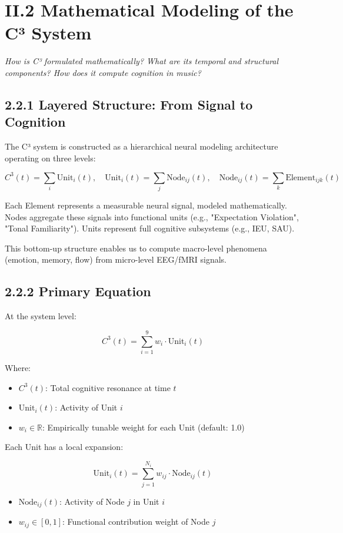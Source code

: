 \section*{II.2 Mathematical Modeling of the C³ System}

\textit{How is C³ formulated mathematically? What are its temporal and structural components? How does it compute cognition in music?}

\subsection*{2.2.1 Layered Structure: From Signal to Cognition}

The C³ system is constructed as a hierarchical neural modeling architecture operating on three levels:

\[
C^3(t) = \sum_i \text{Unit}_i(t), \quad \text{Unit}_i(t) = \sum_j \text{Node}_{ij}(t), \quad \text{Node}_{ij}(t) = \sum_k \text{Element}_{ijk}(t)
\]

Each Element represents a measurable neural signal, modeled mathematically. Nodes aggregate these signals into functional units (e.g., "Expectation Violation", "Tonal Familiarity"). Units represent full cognitive subsystems (e.g., IEU, SAU).

This bottom-up structure enables us to compute macro-level phenomena (emotion, memory, flow) from micro-level EEG/fMRI signals.

\subsection*{2.2.2 Primary Equation}

At the system level:

\[
C^3(t) = \sum_{i=1}^{9} w_i \cdot \text{Unit}_i(t)
\]

Where:

\begin{itemize}
    \item $C^3(t)$: Total cognitive resonance at time $t$
    \item $\text{Unit}_i(t)$: Activity of Unit $i$
    \item $w_i \in \mathbb{R}$: Empirically tunable weight for each Unit (default: 1.0)
\end{itemize}

Each Unit has a local expansion:

\[
\text{Unit}_i(t) = \sum_{j=1}^{N_i} w_{ij} \cdot \text{Node}_{ij}(t)
\]

\begin{itemize}
    \item $\text{Node}_{ij}(t)$: Activity of Node $j$ in Unit $i$
    \item $w_{ij} \in [0,1]$: Functional contribution weight of Node $j$
\end{itemize}

